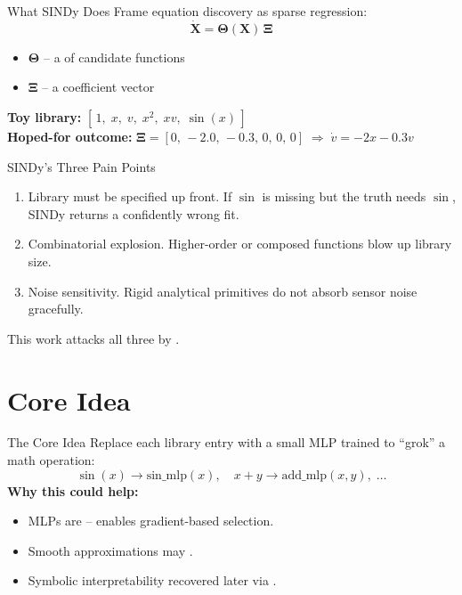 \documentclass[
11pt,notheorems,hyperref={pdfauthor=Aniruddha Pandey}
]{beamer}
\begin{document}
\begin{frame}{What SINDy Does}
Frame equation discovery as sparse regression:
\begin{equation*}
    \dot{\mathbf{X}} = \boldsymbol{\Theta}(\mathbf{X})\,\boldsymbol{\Xi}
\end{equation*}
\begin{itemize}
    \item $\boldsymbol{\Theta}$ -- a  of candidate functions
    \item $\boldsymbol{\Xi}$ -- a  coefficient vector
\end{itemize}
\textbf{Toy library:} $[\,1,\; x,\; v,\; x^2,\; xv,\; \sin(x)\,]$\\[0.3cm]
\textbf{Hoped-for outcome:}
$\boldsymbol{\Xi} = [0,\,-2.0,\,-0.3,\,0,\,0,\,0] \;\Rightarrow\; \dot{v} = -2x - 0.3v$
\end{frame}

\begin{frame}{SINDy's Three Pain Points}
\begin{enumerate}
    \item \alert{Library must be specified up front.} If $\sin$ is missing but the truth needs $\sin$, SINDy returns a confidently wrong fit.
    \item \alert{Combinatorial explosion.} Higher-order or composed functions blow up library size.
    \item \alert{Noise sensitivity.} Rigid analytical primitives do not absorb sensor noise gracefully.
\end{enumerate}
\vspace{0.4cm}
This work attacks all three by .
\end{frame}

\section{Core Idea}

\begin{frame}{The Core Idea}
Replace each library entry with a small MLP trained to ``grok'' a math operation:
\begin{equation*}
\sin(x) \to \mathrm{sin\_mlp}(x), \quad x+y \to \mathrm{add\_mlp}(x,y), \;\dots
\end{equation*}
\textbf{Why this could help:}
\begin{itemize}
    \item MLPs are  -- enables gradient-based selection.
    \item Smooth approximations may .
    \item Symbolic interpretability recovered later via .
\end{itemize}
\end{frame}
\end{document}
